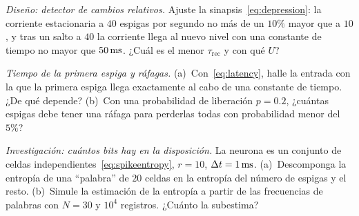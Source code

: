 \begin{exercise}[\lvlB]
\label{ex:04:5}
\emph{Diseño: detector de cambios relativos.} Ajuste la sinapsis~\eqref{eq:depression}: la corriente estacionaria a $40$ espigas por segundo no más de un $10\%$ mayor que a $10$, y tras un salto a $40$ la corriente llega al nuevo nivel con una constante de tiempo no mayor que $50\,\text{ms}$. ¿Cuál es el menor $\tau_{\text{rec}}$ y con qué $U$?
\end{exercise}

\begin{exercise}[\lvlA]
\label{ex:04:6}
\emph{Tiempo de la primera espiga y ráfagas.} (a)~Con~\eqref{eq:latency}, halle la entrada con la que la primera espiga llega exactamente al cabo de una constante de tiempo. ¿De qué depende? (b)~Con una probabilidad de liberación $p=0.2$, ¿cuántas espigas debe tener una ráfaga para perderlas todas con probabilidad menor del $5\%$?
\end{exercise}

\begin{exercise}[\lvlC]
\label{ex:04:7}
\emph{Investigación: cuántos bits hay en la disposición.} La neurona es un conjunto de celdas independientes~\eqref{eq:spikeentropy}, $r=10$, $\Delta t=1\,\text{ms}$. (a)~Descomponga la entropía de una “palabra” de $20$ celdas en la entropía del número de espigas y el resto. (b)~Simule la estimación de la entropía a partir de las frecuencias de palabras con $N=30$ y $10^4$ registros. ¿Cuánto la subestima?
\end{exercise}
